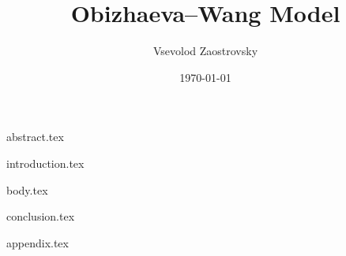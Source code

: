 \documentclass[]{vegaarticle}
\title{Obizhaeva--Wang Model}
\author[1]{Vsevolod Zaostrovsky \email{marty\_mcfly@delorean.edu}}
\affil[1]{Lomonosov Moscow Statr University}
\date{\today}
\begin{document}
    \maketitle	                  %

    {abstract.tex}     %
    
    {introduction.tex} %
    
    {body.tex}         %

    {conclusion.tex}   %

    
    {appendix.tex}     %
\end{document}
